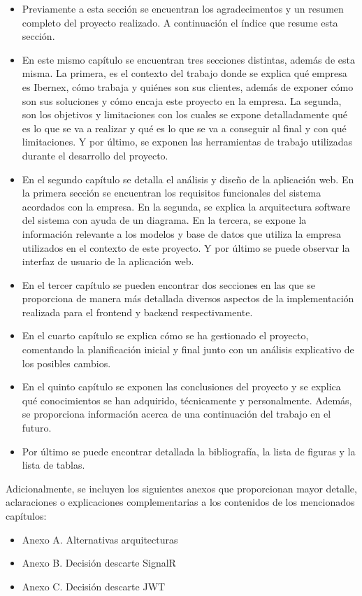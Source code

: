 \begin{itemize}
    \item Previamente a esta sección se encuentran los agradecimentos y un resumen completo del proyecto realizado. A continuación el índice que resume esta sección.
    \item En este mismo capítulo se encuentran tres secciones distintas, además de esta misma. La primera, es el contexto del trabajo donde se explica qué empresa es Ibernex, cómo trabaja y quiénes son sus clientes, además de exponer cómo son sus soluciones y cómo encaja este proyecto en la empresa. La segunda, son los objetivos y limitaciones con los cuales se expone detalladamente qué es lo que se va a realizar y qué es lo que se va a conseguir al final y con qué limitaciones. Y por último, se exponen las herramientas de trabajo utilizadas durante el desarrollo del proyecto.
    \item En el segundo capítulo se detalla el análisis y diseño de la aplicación web. En la primera sección se encuentran los requisitos funcionales del sistema acordados con la empresa. En la segunda, se explica la arquitectura software del sistema con ayuda de un diagrama. En la tercera, se expone la información relevante a los modelos y base de datos que utiliza la empresa utilizados en el contexto de este proyecto. Y por último se puede observar la interfaz de usuario de la aplicación web.
    \item En el tercer capítulo se pueden encontrar dos secciones en las que se proporciona de manera más detallada diversos aspectos de la implementación realizada para el frontend y backend respectivamente.
    \item En el cuarto capítulo se explica cómo se ha gestionado el proyecto, comentando la planificación inicial y final junto con un análisis explicativo de los posibles cambios.
    \item En el quinto capítulo se exponen las conclusiones del proyecto y se explica qué conocimientos se han adquirido, técnicamente y personalmente. Además, se proporciona información acerca de una continuación del trabajo en el futuro.
    \item Por último se puede encontrar detallada la bibliografía, la lista de figuras y la lista de tablas.
\end{itemize}

Adicionalmente, se incluyen los siguientes anexos que proporcionan mayor detalle, aclaraciones o explicaciones complementarias a los contenidos de los mencionados capítulos:

\begin{itemize}
    \item Anexo A. Alternativas arquitecturas
    \item Anexo B. Decisión descarte SignalR
    \item Anexo C. Decisión descarte JWT
\end{itemize}
